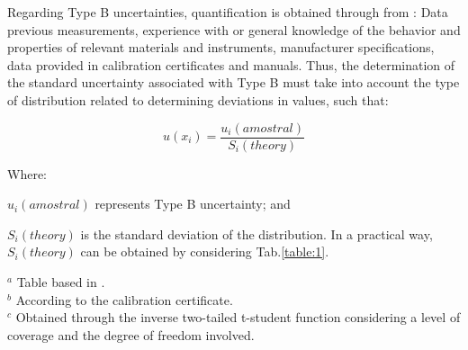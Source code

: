 \documentclass{ws-m3as}
\begin{document}
\begin{romanlist}[(ii)]
Regarding Type B uncertainties, quantification is obtained through from \cite{GUN2008}: Data previous measurements, experience with or general knowledge of the behavior and properties of relevant materials and instruments, manufacturer specifications, data provided in calibration certificates and manuals. Thus, the determination of the standard uncertainty associated with Type B must take into account the type of distribution related to determining deviations in values, such that:

\begin{equation} \label{eq:4.3}
u(x_{i})= \frac{u_ i \left(amostral \right)} {S_i \left( theory \right)}
\end{equation}

Where:

\begin{itemlist}
\item $u_ i\left(amostral\right)$ represents Type B uncertainty; and 
\item $S_i \left( theory\right)$ is the standard deviation of the distribution. In a practical way, $S_i \left( theory\right)$ can be obtained by considering Tab.\ref{table:1}.

\begin{table}[H] 
	\caption{Type B Standard-Uncertainty$^{a}$}
	\label{table:1}
	\begin{center}
	\end{center}
	\footnotesize{$^{a}$ Table based in \protect\cite{GUN2008}.}\\
	\footnotesize{$^{b}$ According to the calibration certificate.}\\
	\footnotesize{$^{c}$ Obtained through the inverse two-tailed t-student function considering a level of coverage and the degree of freedom involved.}
\end{table}
\end{itemlist}


\end{romanlist}
\end{document}
